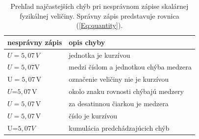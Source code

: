 \begin{table}[h]
\centering
\caption{Prehľad najčastejších chýb pri nesprávnom zápise
skalárnej fyzikálnej veličiny.
Správny zápis predstavuje rovnica (\ref{Eq:quantity}).}
\vspace{12pt}
\begin{tabular}{@{}ll@{}}
  \toprule
  \textbf{nesprávny zápis} & \textbf{opis chyby}\\
  \midrule
  $U = 5{,}07\,V$ & jednotka je kurzívou\\
  $U = 5{,}07\mathrm V$ & medzi číslom a jednotkou chýba medzera\\
  $\mathrm U = 5{,}07\,\mathrm V$ & označenie veličiny nie je kurzívou \\
  $U$=$5{,}07\,\mathrm V$ & okolo znaku rovnosti chýbajú medzery\\
  $U = 5,07\,\mathrm{V}$ & za desatinnou čiarkou je medzera\\
  $U = \mathit{5{,}07}\,\mathrm{V}$ & číslo je kurzívou\\
  U=$\mathit{5,07}V$ & kumulácia predchádzajúcich chýb\\
  \bottomrule
\end{tabular}
\end{table}

